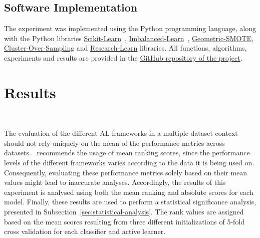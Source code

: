 \documentclass[parskip=full]{scrartcl}
\begin{document}
\subsection{Software Implementation}

The experiment was implemented using the Python programming language, along with
the Python libraries
\href{https://scikit-learn.org/stable/}{Scikit-Learn}~\cite{Pedregosa2011},
\href{https://imbalanced-learn.org/en/stable/}{Imbalanced-Learn}~\cite{JMLR:v18:16-365},
\href{https://geometric-smote.readthedocs.io/en/latest/?badge=latest}{Geometric-SMOTE},
\href{https://cluster-over-sampling.readthedocs.io/en/latest/?badge=latest}{Cluster-Over-Sampling}
and
\href{https://research-learn.readthedocs.io/en/latest/?badge=latest}{Research-Learn}
libraries.  All functions, algorithms, experiments and results are provided in
the
\href{https://github.com/AlgoWit/publications/tree/master/remote-sensing/al-generator}{GitHub
repository of the project}.

\section{Results}~\label{sec:results}

The evaluation of the different AL frameworks in a multiple dataset context
should not rely uniquely on the mean of the performance metrics across
datasets.~\cite{demvsar2006} recommends the usage of mean ranking scores, since
the performance levels of the different frameworks varies according to the data
it is being used on. Consequently, evaluating these performance metrics solely
based on their mean values might lead to inaccurate analyses. Accordingly, the
results of this experiment is analysed using both the mean ranking and absolute
scores for each model. Finally, these results are used to perform a statistical
significance analysis, presented in Subsection~\ref{sec:statistical-analysis}.
The rank values are assigned based on the mean scores resulting from three
different initializations of 5-fold cross validation for each classifier and
active learner.
\end{document}
